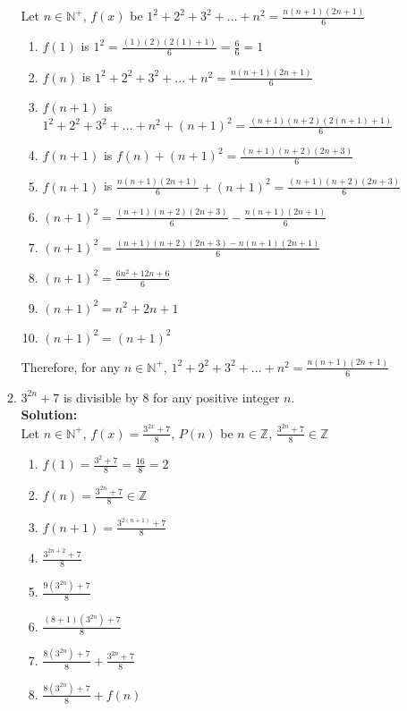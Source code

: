 \documentclass[12pt]{article}
\begin{document}
\begin{enumerate}
\begin{enumerate}
		Let $n \in \mathbb{N}^+$, $f(x)$ be $1^2 + 2^2 + 3^2 +...+ n^2 = \frac{n(n+1)(2n+1)}{6}$
		\begin{enumerate}
			\item $f(1)$ is $1^2 = \frac{(1)(2)(2(1)+1)}{6} = \frac{6}{6} = 1$
			\item $f(n)$ is $1^2 + 2^2 + 3^2 +...+ n^2 = \frac{n(n+1)(2n+1)}{6}$
			\item $f(n + 1)$ is $1^2 + 2^2 + 3^2 +...+ n^2 + (n+1)^2 = \frac{(n+1)(n+2)(2(n+1)+1)}{6}$
			\item $f(n + 1)$ is $f(n) + (n+1)^2 = \frac{(n+1)(n+2)(2n+3)}{6}$
			\item $f(n + 1)$ is $\frac{n(n+1)(2n+1)}{6} + (n+1)^2 = \frac{(n+1)(n+2)(2n+3)}{6}$
			\item $(n+1)^2 = \frac{(n+1)(n+2)(2n+3)}{6} - \frac{n(n+1)(2n+1)}{6}$
			\item $(n+1)^2 = \frac{(n+1)(n+2)(2n+3)-n(n+1)(2n+1)}{6}$
			\item $(n+1)^2 = \frac{6n^2+12n+6}{6}$
			\item $(n+1)^2 = n^2+2n+1$
			\item $(n+1)^2 = (n+1)^2$
		\end{enumerate}

		Therefore, for any $n \in \mathbb{N}^+$, $1^2 + 2^2 + 3^2 +...+ n^2 = \frac{n(n+1)(2n+1)}{6}$

		\newpage
		\item
		$3^{2n} + 7$ is divisible by 8 for any positive integer $n$.\\
		{\bf Solution:}\\

		Let $n \in \mathbb{N}^+$, $f(x) = \frac{3^{2x} + 7}{8}$, $P(n)$ be $n \in \mathbb{Z}$, $\frac{3^{2n} + 7}{8} \in \mathbb{Z}$
		\begin{enumerate}
			\item $f(1) = \frac{3^2+7}{8} = \frac{16}{8} = 2$
			\item $f(n) = \frac{3^{2n}+7}{8} \in \mathbb{Z}$
			\item $f(n+1) = \frac{3^{2(n+1)}+7}{8}$
			\item $\frac{3^{2n+2}+7}{8}$
			\item $\frac{9(3^{2n})+7}{8}$
			\item $\frac{(8+1)(3^{2n})+7}{8}$
			\item $\frac{8(3^{2n})+7}{8}+\frac{3^{2n}+7}{8}$
			\item $\frac{8(3^{2n})+7}{8}+f(n)$
		\end{enumerate}


\end{enumerate}
\end{enumerate}
\end{document}
